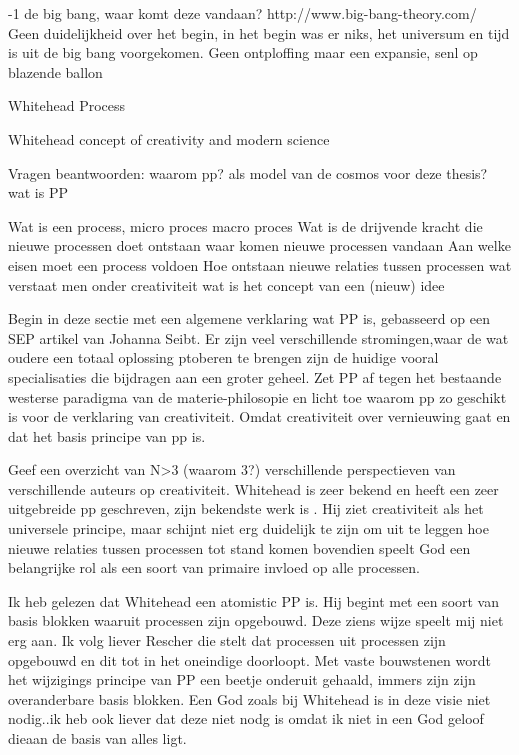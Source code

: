 \documentclass[a4paper]{Thesis}
\begin{document}
-1 de big bang, waar komt deze vandaan?
	http://www.big-bang-theory.com/
		Geen duidelijkheid over het begin, in het begin was er niks, het universum en tijd is uit de big bang voorgekomen.
		Geen ontploffing maar een expansie, senl op blazende ballon
	
Whitehead
	Process

Whitehead concept of creativity and modern science
 	



Vragen beantwoorden:
	waarom pp? als model van de cosmos voor deze thesis?
	wat is PP
	
	Wat is een process, micro proces macro proces
	Wat is de drijvende kracht die nieuwe processen doet ontstaan
	waar komen nieuwe processen vandaan
	Aan welke eisen moet een process voldoen
	Hoe ontstaan nieuwe relaties tussen processen
	wat verstaat men onder creativiteit
	wat is het concept van een (nieuw) idee

Begin in deze sectie met een algemene verklaring wat PP is, gebasseerd op een SEP artikel van Johanna Seibt. Er zijn veel verschillende stromingen,waar de wat oudere een totaal oplossing ptoberen te brengen zijn de huidige vooral specialisaties die bijdragen aan een groter geheel.
Zet PP af tegen het bestaande westerse paradigma van de materie-philosopie en licht toe waarom pp zo geschikt is voor de verklaring van creativiteit. Omdat creativiteit over vernieuwing gaat en dat het basis principe van pp is.

Geef een overzicht van N>3 (waarom 3?) verschillende perspectieven van verschillende auteurs op creativiteit. Whitehead is zeer bekend en heeft een zeer uitgebreide pp geschreven, zijn bekendste werk is \cite{whitehead1929process}. Hij ziet creativiteit als het universele principe, maar schijnt niet erg duidelijk te zijn om uit te leggen hoe nieuwe relaties tussen processen tot stand komen bovendien speelt God een belangrijke rol als een soort van primaire invloed op alle processen.

Ik heb gelezen dat Whitehead een atomistic PP is. Hij begint met een soort van basis blokken waaruit processen zijn opgebouwd. Deze ziens wijze speelt mij niet erg aan. Ik volg liever Rescher die stelt dat processen uit processen zijn opgebouwd en dit tot in het oneindige doorloopt. Met vaste bouwstenen wordt het wijzigings principe van PP een beetje onderuit gehaald, immers zijn zijn overanderbare basis blokken. Een God zoals bij Whitehead is in deze visie niet nodig..ik heb ook liever dat deze niet nodg is omdat ik niet in een God geloof dieaan de basis van alles ligt.
\end{document}
